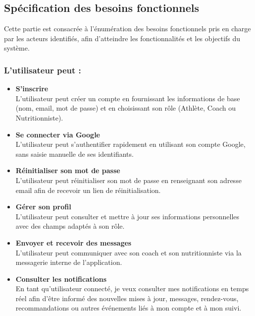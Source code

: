 ﻿\documentclass[a4paper,12pt]{report}
\begin{document}
\subsection{Spécification des besoins fonctionnels}

Cette partie est consacrée à l'énumération des besoins fonctionnels pris en charge par les 
acteurs identifiés, afin d'atteindre les fonctionnalités et les objectifs du système.

\subsubsection*{L'utilisateur peut :}
\begin{itemize}
    \item \textbf{S'inscrire} \\
    L'utilisateur peut créer un compte en fournissant les informations 
    de base (nom, email, mot de passe) et en choisissant son rôle (Athlète, Coach ou Nutritionniste).
    \item \textbf{Se connecter via Google} \\
    L'utilisateur  peut s'authentifier rapidement en 
    utilisant son compte Google, sans saisie manuelle de ses identifiants.
    \item \textbf{Réinitialiser son mot de passe} \\
    L'utilisateur peut réinitialiser son mot de 
    passe en renseignant son adresse email afin de recevoir un lien de réinitialisation.
     \item \textbf{Gérer son profil} \\
     L'utilisateur peut consulter et mettre à jour ses informations 
    personnelles avec des champs adaptés à son rôle.
    \item \textbf{Envoyer et recevoir des messages} \\
    L'utilisateur peut communiquer avec son coach 
    et son nutritionniste via la messagerie interne de l'application.
    \item \textbf{Consulter les notifications} \\ 
En tant qu'utilisateur connecté, je veux consulter mes notifications en temps réel afin d'être informé des nouvelles mises à jour, messages, rendez-vous, recommandations ou autres événements liés à mon compte et à mon suivi.

\end{itemize}
\end{document}
